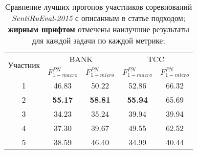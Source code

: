 \begin{table}[htp!]
\centering
\caption{Сравнение лучших прогонов участников соревнований {\it SentiRuEval-2015}
    с описанным в статье подходом;
    {\bf жирным шрифтом} отмечены наилучшие результаты для каждой задачи по
    каждой метрике;
}
\label{table:comparison}
\begin{tabular}{ccccc}
\hline
\multicolumn{1}{l|}{\multirow{2}{*}{Участник}}                       & \multicolumn{2}{c|}{BANK}                                                         & \multicolumn{2}{c}{TCC}                                      \\ \cline{2-5}
\multicolumn{1}{l|}{}                                                & \multicolumn{1}{c|}{$F_{1-macro}^{PN}$} & \multicolumn{1}{c|}{$F_{1-micro}^{PN}$} & \multicolumn{1}{c|}{$F_{1-macro}^{PN}$} & $F_{1-micro}^{PN}$ \\ \hline
1                               & 46.83                              & 50.22                                   & 52.86                                   & 66.32                                                        \\
2                               & \textbf{55.17}                     & \textbf{58.81}                          & \textbf{55.94}                          & 65.69                                                        \\
3                               & 34.23                              & 35.24                                   & 39.94                                   & 39.94                                                        \\
4                               & 37.30                              & 39.67                                   & 49.55                                   & 62.52                                                        \\
5                               & 38.59                              & 46.40                                   & 34.99                                   & 40.44                                                        \\

\end{tabular}
\end{table}
